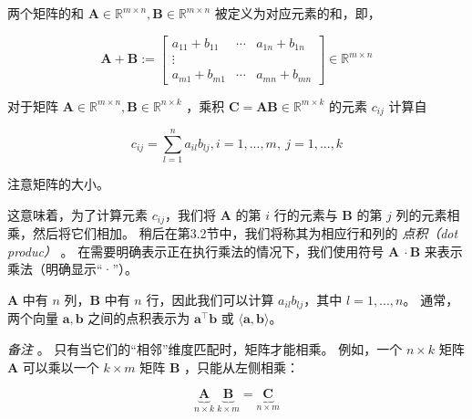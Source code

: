 两个矩阵的和 $ \boldsymbol{A} \in \mathbb{R}^{m \times n}, \boldsymbol{B} \in \mathbb{R}^{m \times n} $ 被定义为对应元素的和，即，

\begin{equation}
\boldsymbol{A} + \boldsymbol{B} := \begin{bmatrix} a_{11} + b_{11} & \cdots & a_{1n} + b_{1n} \\ \vdots \\ a_{m1} + b_{m1} & \cdots & a_{mn} + b_{mn} \end{bmatrix} \in \mathbb{R}^{m \times n}
\tag{2.12}\label{eq:2-12}
\end{equation}

对于矩阵 $ \boldsymbol{A} \in \mathbb{R}^{m \times n}, \boldsymbol{B} \in \mathbb{R}^{n \times k} $ ，乘积 $ \boldsymbol{C} = \boldsymbol{A} \boldsymbol{B} \in \mathbb{R}^{m \times k} $ 的元素 $ c_{ij} $ 计算自

\begin{equation}
c_{ij} = \sum_{l=1}^{n}{a_{il}b_{lj}}, i = 1,...,m, \ j = 1,...,k
\tag{2.13}\label{eq:2-13}
\end{equation}

\begin{notebox}
注意矩阵的大小。
\end{notebox}

这意味着，为了计算元素 $ c_{ij} $，我们将 $ \boldsymbol{A} $ 的第 $ i $ 行的元素与 $ \boldsymbol{B} $ 的第 $ j $ 列的元素相乘，然后将它们相加。 稍后在第3.2节中，我们将称其为相应行和列的 \emph{点积（dot produc）} 。 在需要明确表示正在执行乘法的情况下，我们使用符号 $ \boldsymbol{A} \ · \boldsymbol{B} $  来表示乘法（明确显示“·”）。

\begin{notebox}
$ \boldsymbol{A} $ 中有 $ n $ 列，$ \boldsymbol{B} $ 中有 $ n $ 行，因此我们可以计算 $ a_{il}b_{lj} $，其中 $ l = 1,...,n $。 通常，两个向量 $ \boldsymbol{a}, \boldsymbol{b} $ 之间的点积表示为 $ \boldsymbol{a}^\top \boldsymbol{b} $ 或 $ \langle \boldsymbol{a}, \boldsymbol{b} \rangle $。
\end{notebox}

\emph{备注} 。 只有当它们的“相邻”维度匹配时，矩阵才能相乘。 例如，一个 $ n \times k $ 矩阵 $ \boldsymbol{A} $ 可以乘以一个 $ k \times m $ 矩阵 $ \boldsymbol{B} $ ，只能从左侧相乘：

\begin{equation}
\underbrace{\boldsymbol{A}}_{n \times k} \  \underbrace{\boldsymbol{B}}_{k \times m} = \underbrace{\boldsymbol{C}}_{n \times m}
\tag{2.14}\label{eq:2-14}
\end{equation}

